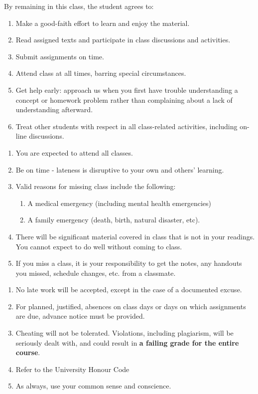 \documentclass[a4paper,landscape,headrule,footrule,xetex,25pt]{foils}
\begin{document}
By remaining in this class, the student agrees to:
\begin{enumerate}\addtolength{\itemsep}{-1ex}
\item  Make a good-faith effort to learn and enjoy the material.
\item  Read assigned texts and participate in class discussions and activities.
\item Submit assignments on time.
\item Attend class at all times, barring special circumstances.
\item Get help early: approach us when you first have trouble understanding a concept or homework problem rather than complaining about a lack of understanding afterward.
\item Treat other students with respect in all class-related activities, including on-line discussions.
\end{enumerate}
\begin{enumerate}\addtolength{\itemsep}{-1ex}
\item You are expected to attend all classes.
\item Be on time - lateness is disruptive to your own and others' learning.
\item Valid reasons for missing class include the following:
\begin{enumerate}
\item A medical emergency (including mental health emergencies)
\item A family emergency (death, birth, natural disaster, etc).
\end{enumerate}
\item There will be significant material covered in class that is not in your readings.  You cannot expect to do well without coming to class.
\item If you miss a class, it is your responsibility to get the notes, any handouts you missed, schedule changes, etc. from a classmate.
\end{enumerate}

\begin{enumerate}
\item No late work will be accepted, except in the case of a documented excuse.
\item For planned, justified, absences on class days or days on which assignments are due, advance notice must be provided.
\item Cheating will not be tolerated. Violations, including plagiarism, will be seriously dealt with, and could result in \textbf{a failing grade for the entire course}.
\item Refer to the University Honour Code
\item As always, use your common sense and conscience.
\end{enumerate}
\end{document}
